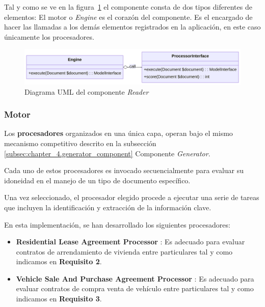Tal y como se ve en la figura~\ref{fig:chapter_4.1.reader_component_uml} el componente consta de dos tipos diferentes de
elementos: El motor o \textit{Engine} es el corazón del componente.
Es el encargado de hacer las llamadas a los demás elementos registrados en la aplicación, en este caso únicamente los
procesadores.

\begin{figure}[ht]
    \begin{center}
        \includegraphics[width=\textwidth]{./chapter/4/images/chapter_4.1.reader_component_uml}
        \caption{Diagrama UML del componente \textit{Reader}}
        \label{fig:chapter_4.1.reader_component_uml}
    \end{center}
\end{figure}

\subsubsection*{Motor}

Los \textbf{procesadores} organizados en una única capa,  operan bajo el mismo mecanismo competitivo descrito en la
subsección \ref{subsec:chapter_4.generator_component} Componente \textit{Generator}.

Cada uno de estos procesadores es invocado secuencialmente para evaluar su idoneidad en el manejo de un tipo de
documento específico.

Una vez seleccionado, el procesador elegido procede a ejecutar una serie de tareas que incluyen la identificación y
extracción de la información clave.

En esta implementación, se han desarrollado los siguientes procesadores:

\begin{itemize}
    \item \textbf{Residential Lease Agreement Processor}
    : Es adecuado para evaluar contratos de arrendamiento de vivienda entre
    particulares tal y como indicamos en \textbf{Requisito 2}.
    \item \textbf{Vehicle Sale And Purchase Agreement Processor}
    : Es adecuado para evaluar contratos de compra venta de vehículo
    entre particulares tal y como indicamos en \textbf{Requisito 3}.
\end{itemize}
